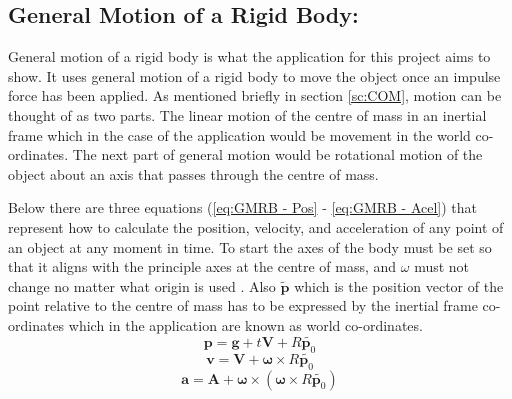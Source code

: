 \subsection{General Motion of a Rigid Body:}\label{sc:GMORB}
General motion of a rigid body is what the application for this project aims to show.
It uses general motion of a rigid body to move the object once an impulse force has been applied.
As mentioned briefly in section \ref{sc:COM}, motion can be thought of as two parts.
The linear motion of the centre of mass in an inertial frame which in the case of the application would be movement in the world co-ordinates.
The next part of general motion would be rotational motion of the object about an axis that passes through the centre of mass. 

Below there are three equations (\ref{eq:GMRB - Pos} - \ref{eq:GMRB - Acel}) that represent how to calculate the position, velocity, and acceleration of any point of an object at any moment in time.
To start the axes of the body must be set so that it aligns with the principle axes at the centre of mass, and $\omega$ must not change no matter what origin is used \citep{mactaggart2013l9}.
Also $\tilde{\mathbf{p}}$ which is the position vector of the point relative  to the centre of mass has to be expressed by the inertial frame co-ordinates which in the application are known as world co-ordinates.
\begin{equation}\label{eq:GMRB - Pos}
\mathbf{p}=\mathbf{g}+t\mathbf{V}+{R}\tilde{\mathbf{p}_{0}}
\end{equation}
\begin{equation}\label{eq:GMRB - Velo}
\mathbf{v}=\mathbf{V}+\boldsymbol\omega\times{R}\tilde{\mathbf{p}_{0}}
\end{equation}
\begin{equation}\label{eq:GMRB - Acel}
\mathbf{a}=\mathbf{A}+\boldsymbol\omega\times(\boldsymbol\omega\times{R}\tilde{\mathbf{p}_{0}})
\end{equation}

